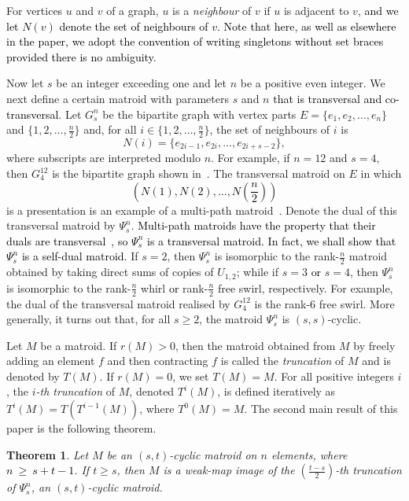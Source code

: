 \documentclass[11pt]{amsart}
\newtheorem{theorem}{Theorem}[section]
\newcommand{\blue}{\textcolor{black}}
\newcommand{\bloo}{\textcolor{black}}
\begin{document}
For vertices $u$ and $v$ of a graph, $u$ is a {\em neighbour} of $v$ if $u$ is adjacent to $v$, \bloo{and we let $N(v)$ denote the set of neighbours of $v$. Note that here, as well as elsewhere in the paper, we adopt the convention of writing singletons without set braces provided there is no ambiguity.}

Now let $s$ be an integer exceeding one and let $n$ be a positive even integer. We next define a certain matroid with parameters $s$ and $n$ \blue{that is transversal and co-transversal}. Let $G^n_s$ be the bipartite graph with vertex parts $E=\{e_1, e_2, \ldots, e_n\}$ and $\{1, 2, \ldots, \frac{n}{2}\}$ and, for all $i\in \{1, 2, \ldots, \frac{n}{2}\}$, the set of neighbours of $i$ is
$$N(i)=\{e_{2i-1}, e_{2i}, \ldots, e_{2i+s-2}\},$$
where subscripts are interpreted modulo $n$. For example, if $n = 12$ and $s = 4$, then $G^{12}_4$ is the bipartite graph shown in~. The transversal matroid on $E$ in which
\bloo{$$(N(1), N(2), \ldots, N(\textstyle{\frac{n}{2}}))$$}
is a presentation is an example of a multi-path matroid~\cite{bon07}. Denote the dual of this transversal matroid by $\Psi^n_s$. \bloo{Multi-path matroids have the property that their duals are transversal~\cite[Theorem~3.8]{bon07}, so $\Psi^n_s$ is a transversal matroid. In fact, we shall show that $\Psi^n_s$ is a self-dual matroid.} If $s=2$, then $\Psi^n_s$ is isomorphic to the rank-$\frac{n}{2}$ matroid obtained by taking direct sums of copies of $U_{1, 2}$; while if $s=3$ \blue{or} $s=4$, then $\Psi^n_s$ is isomorphic to the rank-$\frac{n}{2}$ whirl \blue{or} rank-$\frac{n}{2}$ free swirl, respectively. For example, the dual of the transversal matroid realised by $G^{12}_4$ is the rank-$6$ free swirl. More generally, it turns out that, for all $s\ge 2$, the matroid $\Psi^n_s$ is $(s, s)$-cyclic.

Let $M$ be a matroid. If $r(M)>0$, then the matroid obtained from $M$ by freely adding an element $f$ and then contracting $f$ is called the {\em truncation} of $M$ and is denoted by $T(M)$. If $r(M)=0$, we set $T(M)=M$. For all positive integers $i$, the {\em $i$-th truncation} of $M$, denoted $T^i(M)$, is defined iteratively as $T^i(M)=T(T^{i-1}(M))$, where $T^0(M)=M$. The second main result of this paper is the following theorem.

\begin{theorem}
Let $M$ be an $(s, t)$-cyclic matroid on $n$ elements, where \blue{$n~\geq~s+t-1$}. If $t\ge s$, then $M$ is a weak-map image of the $\left(\frac{t-s}{2}\right)$-th truncation of $\Psi^n_s$, an $(s, t)$-cyclic matroid.
\label{free}
\end{theorem}
\end{document}
